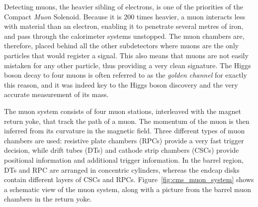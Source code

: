Detecting muons, the heavier sibling of electrons, is one of the priorities of the Compact
\textit{Muon} Solenoid. Because it is 200 times heavier, a muon interacts less with material than
an electron, enabling it to penetrate several metres of iron, and pass through the calorimeter
systems unstopped. The muon chambers are, therefore, placed behind all the other subdetectors
where muons are the only particles that would register a signal. 
This also means that muons are not easily mistaken for any other particle, thus providing a very
clean signature. The Higgs boson decay to four muons is often referred to as the \textit{golden
channel} for exactly this reason, and it was indeed key to the Higgs boson discovery and the very
accurate measurement of its mass. 

The muon system consists of four muon stations, interleaved with the magnet return yoke, that track
the path of a muon. The momentum of the muon is then inferred from its curvature in the magnetic
field. Three different types of muon chambers are used: resistive plate chambers (RPCs) provide a
very fast trigger decision, while drift tubes (DTs) and cathode strip
chambers (CSCs) provide positional information and additional trigger information.
In the barrel region, DTs and RPC are arranged in concentric cylinders, whereas the endcap disks
contain different layers of CSCs and RPCs. Figure~\ref{fig:cms_muon_system} shows a schematic view
of the muon system, along with a picture from the barrel muon chambers in the return yoke. 

